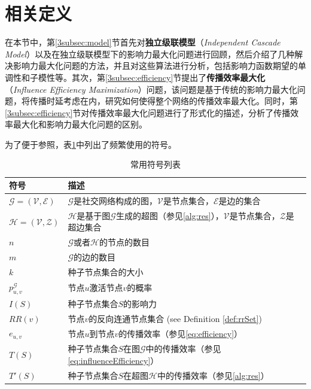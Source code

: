 \section{相关定义}
\label{3sec:definition}
在本节中，第\ref{3subsec:model}节首先对\textbf{独立级联模型}（\textit{Independent Cascade Model}）以及在独立级联模型下的影响力最大化问题进行回顾，然后介绍了几种解决影响力最大化问题的方法，并且对这些算法进行分析，包括影响力函数期望的单调性和子模性等。其次，第\ref{3subsec:efficiency}节提出了\textbf{传播效率最大化}（\textit{Influence Efficiency Maximization}）问题，该问题是基于传统的影响力最大化问题，将传播时延考虑在内，研究如何使得整个网络的传播效率最大化。同时，第\ref{3subsec:efficiency}节对传播效率最大化问题进行了形式化的描述，分析了传播效率最大化和影响力最大化问题的区别。

为了便于参照，表\ref{3tab:notation}中列出了频繁使用的符号。

\begin{table}[ht]
\centering
\caption{常用符号列表}
\begin{tabular}{|p{2cm}|p{10cm}|}
\hline
\textbf{符号} & \textbf{描述} \\
\hline
$\mathcal{G}=\left(\mathcal{V},\mathcal{E}\right)$ & $\mathcal{G}$是社交网络构成的图，$\mathcal{V}$是节点集合，$\mathcal{E}$是边的集合\\
\hline
$\mathcal{H}=\left(\mathcal{V},\mathcal{Z}\right)$ & $\mathcal{H}$是基于图$\mathcal{G}$生成的超图（参见\ref{alg:res}），$\mathcal{V}$是节点集合，$\mathcal{Z}$是超边集合\\
\hline
$n$ & $\mathcal{G}$或者$\mathcal{H}$的节点的数目 \\
\hline
$m$ & $\mathcal{G}$的边的数目 \\
\hline
$k$ & 种子节点集合的大小 \\
\hline
$p^\mathcal{G}_{u,v}$ & 节点$u$激活节点$v$的概率 \\
\hline
$I\left(S\right)$ & 种子节点集合$S$的影响力 \\
\hline
$RR\left(v\right)$ & 节点$v$的反向连通节点集合 (see Definition \ref{def:rrSet}) \\
\hline
$e_{u,v}$ & 节点$u$到节点$v$的传播效率（参见\ref{eq:efficiency}） \\
\hline
$T\left(S\right)$ & 种子节点集合$S$在图$\mathcal{G}$中的传播效率（参见\ref{eq:influenceEfficiency}）\\
\hline
$T'\left(S\right)$ & 种子节点集合$S$在超图$\mathcal{H}$中的传播效率（参见\ref{alg:res}）\\
\hline
\end{tabular}
\label{3tab:notation}
\end{table}

